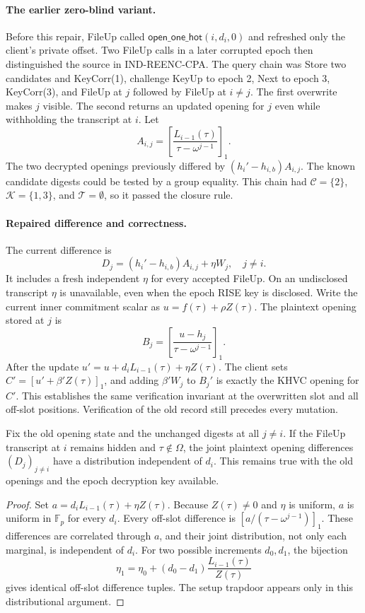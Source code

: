 \paragraph{The earlier zero-blind variant.}
Before this repair, FileUp called $\mathsf{open\_one\_hot}(i,d_i,0)$ and refreshed only the client's private offset. Two FileUp calls in a later corrupted epoch then distinguished the source in IND-REENC-CPA. The query chain was Store two candidates and KeyCorr(1), challenge KeyUp to epoch 2, Next to epoch 3, KeyCorr(3), and FileUp at $j$ followed by FileUp at $i\ne j$. The first overwrite makes $j$ visible. The second returns an updated opening for $j$ even while withholding the transcript at $i$. Let
\[
 A_{i,j}=\left[\frac{L_{i-1}(\tau)}{\tau-\omega^{j-1}}\right]_1 .
\]
The two decrypted openings previously differed by $(h_i'-h_{i,b})A_{i,j}$. The known candidate digests could be tested by a group equality. This chain had $\mathcal C=\{2\}$, $\mathcal K=\{1,3\}$, and $\mathcal T=\emptyset$, so it passed the closure rule.

\paragraph{Repaired difference and correctness.}
The current difference is
\[
 D_j=(h_i'-h_{i,b})A_{i,j}+\eta W_j,\quad j\ne i .
\]
It includes a fresh independent $\eta$ for every accepted FileUp. On an undisclosed transcript $\eta$ is unavailable, even when the epoch RISE key is disclosed. Write the current inner commitment scalar as $u=f(\tau)+\rho Z(\tau)$. The plaintext opening stored at $j$ is
\[
 B_j=\left[\frac{u-h_j}{\tau-\omega^{j-1}}\right]_1 .
\]
After the update $u'=u+d_iL_{i-1}(\tau)+\eta Z(\tau)$. The client sets $C'=[u'+\beta'Z(\tau)]_1$, and adding $\beta'W_j$ to $B_j'$ is exactly the KHVC opening for $C'$. This establishes the same verification invariant at the overwritten slot and all off-slot positions. Verification of the old record still precedes every mutation.

\begin{lemma}
\label{lem:joint-fileup-mask}
Fix the old opening state and the unchanged digests at all $j\ne i$. If the FileUp transcript at $i$ remains hidden and $\tau\notin\Omega$, the joint plaintext opening differences $(D_j)_{j\ne i}$ have a distribution independent of $d_i$. This remains true with the old openings and the epoch decryption key available.
\end{lemma}
\begin{proof}
Set $a=d_iL_{i-1}(\tau)+\eta Z(\tau)$. Because $Z(\tau)\ne0$ and $\eta$ is uniform, $a$ is uniform in $\mathbb F_p$ for every $d_i$. Every off-slot difference is $[a/(\tau-\omega^{j-1})]_1$. These differences are correlated through $a$, and their joint distribution, not only each marginal, is independent of $d_i$. For two possible increments $d_0,d_1$, the bijection
\[
 \eta_1=\eta_0+(d_0-d_1)\frac{L_{i-1}(\tau)}{Z(\tau)}
\]
gives identical off-slot difference tuples. The setup trapdoor appears only in this distributional argument.
\end{proof}

